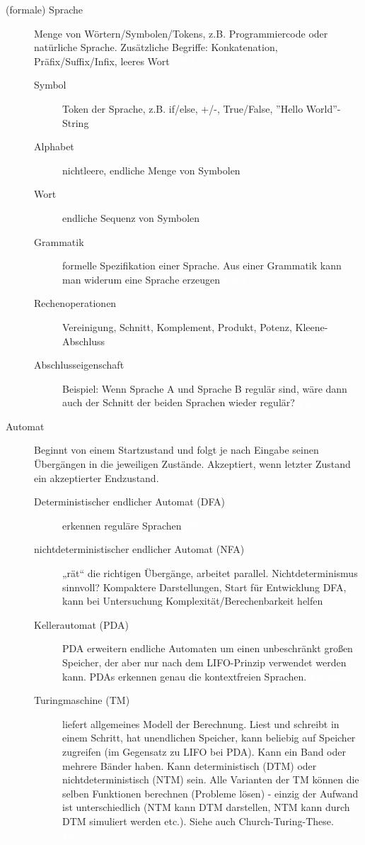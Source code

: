\documentclass[a4paper,10pt]{article}
\newcommand{\vl}[1]{\colorbox{vl}{\textcolor{white}{\small\textbf{#1}}}}
\begin{document}
    \begin{description}
        \item[(formale) Sprache] Menge von Wörtern/Symbolen/Tokens, z.B. Programmiercode oder natürliche Sprache.
            Zusätzliche Begriffe: Konkatenation, Präfix/Suffix/Infix, leeres Wort \vl{FS 1}
            \begin{description}
                \item[Symbol] Token der Sprache, z.B. if/else, +/-, True/False, ''Hello World''-String
                \item[Alphabet] nichtleere, endliche Menge von Symbolen
                \item[Wort] endliche Sequenz von Symbolen
                \item[Grammatik] formelle Spezifikation einer Sprache. Aus einer Grammatik kann man widerum eine Sprache erzeugen \vl{FS 2}
                \item[Rechenoperationen] Vereinigung, Schnitt, Komplement, Produkt, Potenz, Kleene-Abschluss
                \item[Abschlusseigenschaft] Beispiel: Wenn Sprache A und Sprache B regulär sind, wäre dann auch der Schnitt der beiden Sprachen wieder regulär? \vl{FS 5}
            \end{description}

        \item[Automat]
            Beginnt von einem Startzustand und folgt je nach Eingabe seinen Übergängen in die jeweiligen Zustände.
            Akzeptiert, wenn letzter Zustand ein akzeptierter Endzustand.
            \begin{description}
                \item[Deterministischer endlicher Automat (DFA)] erkennen reguläre Sprachen \vl{FS 3}
                \item[nichtdeterministischer endlicher Automat (NFA)] „rät“ die richtigen Übergänge, arbeitet parallel. Nichtdeterminismus sinnvoll? Kompaktere Darstellungen, Start für Entwicklung DFA, kann bei Untersuchung Komplexität/Berechenbarkeit helfen \vl{FS 4}
                \item[Kellerautomat (PDA)]
                    PDA erweitern endliche Automaten um einen unbeschränkt großen Speicher, der aber nur nach dem LIFO-Prinzip verwendet werden
                    kann. PDAs erkennen genau die kontextfreien Sprachen. \vl{FS 15}
                \item[Turingmaschine (TM)]
                    liefert allgemeines Modell der Berechnung. Liest und schreibt in einem Schritt, hat unendlichen
                    Speicher, kann beliebig auf Speicher zugreifen (im Gegensatz zu LIFO bei PDA).
                    Kann ein Band oder mehrere Bänder haben.
                    Kann deterministisch (DTM) oder nichtdeterministisch (NTM) sein.
                    Alle Varianten der TM können die selben Funktionen berechnen (Probleme lösen) - einzig der Aufwand ist unterschiedlich (NTM kann DTM darstellen, NTM kann durch DTM simuliert werden etc.).
                    Siehe auch Church-Turing-These. \vl{FS 18}
            \end{description}



\end{description}
\end{document}
